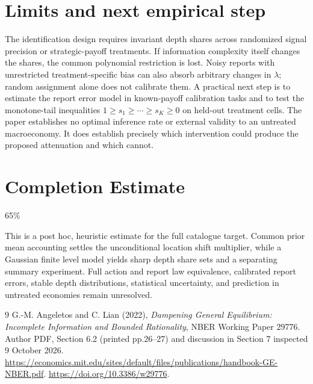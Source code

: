 \documentclass[11pt]{article}
\theoremstyle{remark}
\begin{document}
\section{Limits and next empirical step}
The identification design requires invariant depth shares across randomized signal precision or strategic-payoff treatments. If information complexity itself changes the shares, the common polynomial restriction is lost. Noisy reports with unrestricted treatment-specific bias can also absorb arbitrary changes in $\lambda$; random assignment alone does not calibrate them. A practical next step is to estimate the report error model in known-payoff calibration tasks and to test the monotone-tail inequalities $1\geq s_1\geq\cdots\geq s_K\geq0$ on held-out treatment cells. The paper establishes no optimal inference rate or external validity to an untreated macroeconomy. It does establish precisely which intervention could produce the proposed attenuation and which cannot.

\section{Completion Estimate}
65\%

This is a post hoc, heuristic estimate for the full catalogue target.
Common prior mean accounting settles the unconditional location shift multiplier, while a Gaussian finite level model yields sharp depth share sets and a separating summary experiment. Full action and report law equivalence, calibrated report errors, stable depth distributions, statistical uncertainty, and prediction in untreated economies remain unresolved.

\begin{thebibliography}{9}
 G.-M. Angeletos and C. Lian (2022), \emph{Dampening General Equilibrium: Incomplete Information and Bounded Rationality}, NBER Working Paper 29776. Author PDF, Section 6.2 (printed pp.26--27) and discussion in Section 7 inspected 9 October 2026. \url{https://economics.mit.edu/sites/default/files/publications/handbook-GE-NBER.pdf}. \url{https://doi.org/10.3386/w29776}.
\end{thebibliography}
\end{document}
